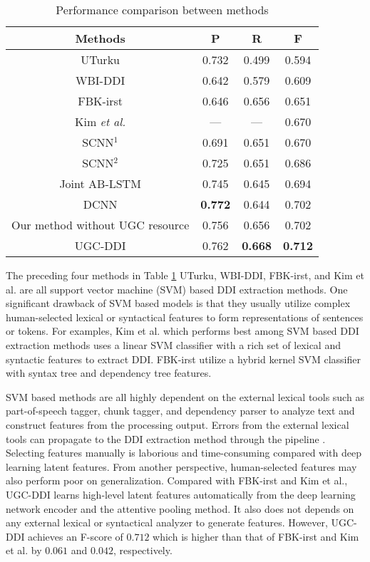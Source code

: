 \documentclass[conference]{IEEEtran}
\begin{document}
\begin{table}
\caption{Performance comparison between methods}
\label{table:comp}
\centering
\begin{tabular}{cccc}
\hline
 Methods & P & R & F \\ \hline
 UTurku \cite{bjorne_uturku:_2013} & 0.732 &  0.499 &  0.594\\
 WBI-DDI \cite{thomas_wbi-ddi:_2013} & 0.642 &  0.579 &  0.609 \\
 FBK-irst \cite{chowdhury_fbk-irst:_2013} &  0.646 & 0.656 & 0.651\\
 Kim \emph{et al.} \cite{kim_extracting_2015} & --- & --- &  0.670\\
  SCNN$^1$ \cite{zhao_drug_2016} &  0.691 & 0.651 & 0.670\\
 SCNN$^2$ \cite{zhao_drug_2016} &  0.725 & 0.651 & 0.686\\
 Joint AB-LSTM \cite{sahu_drug-drug_2017} &  0.745 & 0.645 & 0.694\\
 DCNN \cite{liu_dependency-based_2016} & \textbf{0.772} & 0.644 & 0.702 \\
 Our method without UGC resource & 0.756 & 0.656 & 0.702 \\
 UGC-DDI & 0.762 & \textbf{0.668} & \textbf{0.712} \\\hline
\end{tabular}
\end{table}

The preceding four methods in Table \ref{table:comp} UTurku, WBI-DDI, FBK-irst, and Kim et al. are all support vector machine (SVM) based DDI extraction methods.
One significant drawback of SVM based models is that they usually utilize complex human-selected lexical or
syntactical features to form representations of sentences or tokens.
For examples, Kim et al. which performs best among SVM based DDI extraction methods uses a linear SVM classifier
with a rich set of lexical and syntactic features to extract DDI.
FBK-irst utilize a hybrid kernel SVM classifier with syntax tree and dependency tree features.

SVM based methods are all highly dependent on the external lexical tools such as part-of-speech tagger,
chunk tagger, and dependency parser to analyze text and construct features from the processing output.
Errors from the external lexical tools can propagate to the DDI extraction method through the pipeline \cite{jiao_chinese_2018}.
Selecting features manually is laborious and time-consuming compared with deep learning latent features.
From another perspective, human-selected features may also perform poor on generalization.
Compared with FBK-irst and Kim et al., UGC-DDI learns high-level latent features automatically from the deep learning network encoder
and the attentive pooling method.
It also does not depends on any external lexical or syntactical analyzer to generate features.
However, UGC-DDI achieves an F-score of $0.712$ which is higher than that of FBK-irst and Kim et al. by $0.061$ and $0.042$, respectively.
\end{document}
